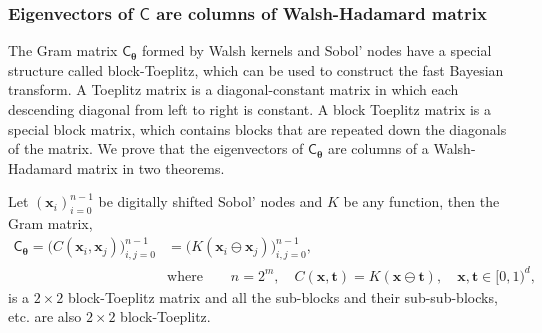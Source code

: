 \documentclass[graybox,footinfo]{svmult}
\newcommand{\bm}[1]{\boldsymbol{#1}}
\newcommand{\vtheta}{{\bm{\theta}}}
\newcommand{\vt}{\bm{t}}
\newcommand{\vx}{\bm{x}}
\newcommand{\mC}{\mathsf{C}}
\newcommand{\mCtheta}{{\mathsf{C}_{\vtheta}}}
\begin{document}
\subsubsection{Eigenvectors of $\mC$ are columns of Walsh-Hadamard matrix}
\label{sec:eigenvector_hadamard}
The Gram matrix $\mCtheta$ formed by Walsh kernels and Sobol' nodes have a special structure called  block-Toeplitz, which can be used to construct the fast Bayesian transform. 
A Toeplitz matrix is a diagonal-constant matrix in which each descending diagonal from left to right is constant. A block Toeplitz matrix is a special block matrix, which contains blocks that are repeated down the diagonals of the matrix.
We prove that the eigenvectors of $\mCtheta$ are columns of a Walsh-Hadamard matrix in two theorems. 

\begin{theorem}
	\label{thrm:block-toeplitz}
	Let $\left(\vx_i\right)_{i=0}^{n-1}$ be digitally shifted Sobol' nodes and $K$ be any function,
	then the Gram matrix,
	\begin{align*}
	\mCtheta = \bigl(C(\vx_i, \vx_j)\bigr)_{i,j=0}^{n-1} &= \bigl(K(\vx_i \ominus \vx_j)\bigr)_{i,j=0}^{n-1},   \\ & \text{where} \quad \quad n=2^m, \quad C(\vx, \vt) = K(\vx \ominus \vt), \quad  \vx, \vt \in [0,1)^d, \qquad
	\end{align*}
	is a $2\times 2$ block-Toeplitz matrix and all the sub-blocks and their sub-sub-blocks, etc. are also $2\times 2$ block-Toeplitz. 
\end{theorem}
\end{document}
